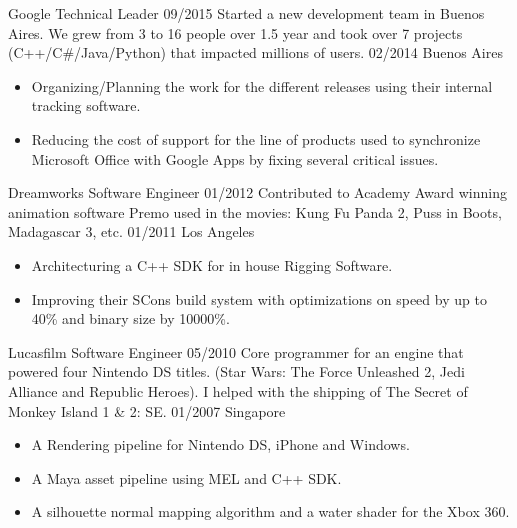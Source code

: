 \begin{experiences}
   \experience
    {Google} 				{Technical Leader}
	{09/2015} 			{Started a new development team in Buenos Aires. We grew from 3 to 16 people over 1.5 year and took over 7 projects (C++/C\#/Java/Python) that impacted millions of users.}
	{02/2014}	 	
	{Buenos Aires}			{
						  \begin{itemize}
							\item Organizing/Planning the work for the different releases using their internal tracking software.
							\item Reducing the cost of support for the line of products used to synchronize Microsoft Office with Google Apps by fixing several critical issues.
						  \end{itemize}
						 }
   \emptySeparator
   
   \experience
    {Dreamworks} 			{Software Engineer}
    {01/2012} 				{Contributed to Academy Award winning animation software Premo used in the movies: Kung Fu Panda 2, Puss in Boots, Madagascar 3, etc.}
	{01/2011}	 	
	{Los Angeles}			{
						  \begin{itemize}
							\item Architecturing a C++ SDK for in house Rigging Software.
							\item Improving their SCons build system with optimizations on speed by up to 40\% and binary size by 10000\%.
						  \end{itemize}
						 }
   \emptySeparator
   
   \experience
    {Lucasfilm} 			{Software Engineer}
    {05/2010} 				{Core programmer for an engine that powered four Nintendo DS titles. (Star Wars: The Force Unleashed 2, Jedi Alliance and Republic Heroes). I helped with the shipping of The Secret of Monkey Island 1 \& 2: SE.}
	{01/2007}	 	
	{Singapore}			{
						  \begin{itemize}
							\item A Rendering pipeline for Nintendo DS, iPhone and Windows.
							\item A Maya asset pipeline using MEL and C++ SDK.
							\item A silhouette normal mapping algorithm and a water shader for the Xbox 360.
						  \end{itemize}
						 }
  
\end{experiences}
